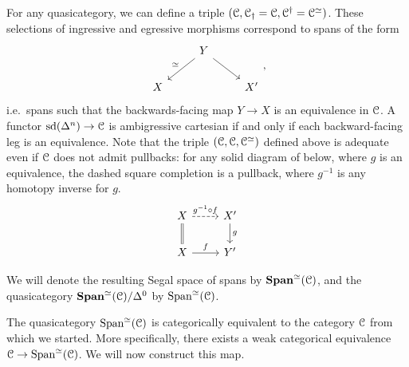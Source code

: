 \documentclass[main.tex]{subfiles}
\begin{document}
\begin{example}
  \label{eg:spans_with_equivalences_on_one_leg}
  For any quasicategory, we can define a triple $(\mathcal{C}, \mathcal{C}_{\dagger} = \mathcal{C}, \mathcal{C}^{\dagger} = \mathcal{C}^{\simeq})$. These selections of ingressive and egressive morphisms correspond to spans of the form
  \begin{equation*}
    \begin{tikzcd}
      & Y
      \arrow[dl, swap, "\simeq"]
      \arrow[dr]
      \\
      X
      && X'
    \end{tikzcd},
  \end{equation*}
  i.e.\ spans such that the backwards-facing map $Y \to X$ is an equivalence in $\mathcal{C}$. A functor $\mathrm{sd}(\Delta^{n}) \to \mathcal{C}$ is ambigressive cartesian if and only if each backward-facing leg is an equivalence. Note that the triple $(\mathcal{C}, \mathcal{C}, \mathcal{C}^{\simeq})$ defined above is adequate even if $\mathcal{C}$ does not admit pullbacks: for any solid diagram of below, where $g$ is an equivalence, the dashed square completion is a pullback, where $g^{-1}$ is any homotopy inverse for $g$.
  \begin{equation*}
    \begin{tikzcd}
      X
      \arrow[r, dashed, "g^{-1} \circ f"]
      \arrow[d, swap, equals]
      & X'
      \arrow[d, "g"]
      \\
      X
      \arrow[r, "f"]
      & Y'
    \end{tikzcd}
  \end{equation*}

  We will denote the resulting Segal space of spans by $\mathbf{Span}^{\simeq}(\mathcal{C})$, and the quasicategory $\mathbf{Span}^{\simeq}(\mathcal{C})/\Delta^{0}$ by $\mathrm{Span}^{\simeq}(\mathcal{C})$. 

  The quasicategory $\mathrm{Span}^{\simeq}(\mathcal{C})$ is categorically equivalent to the category $\mathcal{C}$ from which we started. More specifically, there exists a weak categorical equivalence $\mathcal{C} \to \mathrm{Span}^{\simeq}(\mathcal{C})$. We will now construct this map. 


\end{example}
\end{document}
